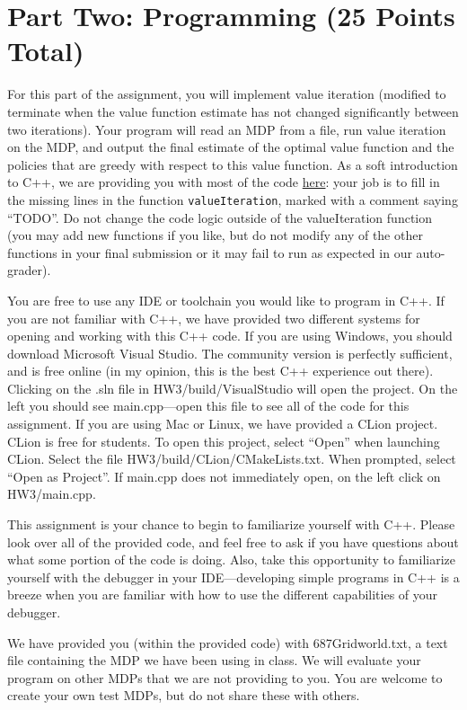 \documentclass[]{article}
\begin{document}
\section*{Part Two: Programming (25 Points Total)}

For this part of the assignment, you will implement value iteration (modified to terminate when the value function estimate has not changed significantly between two iterations). Your program will read an MDP from a file, run value iteration on the MDP, and output the final estimate of the optimal value function and the policies that are greedy with respect to this value function. As a soft introduction to C++, we are providing you with most of the code \href{https://people.cs.umass.edu/~pthomas/courses/CMPSCI_687_Fall2019/HW3Source.zip}{here}: your job is to fill in the missing lines in the function \texttt{valueIteration}, marked with a comment saying ``TODO''. Do not change the code logic outside of the valueIteration function (you may add new functions if you like, but do not modify any of the other functions in your final submission or it may fail to run as expected in our auto-grader).

You are free to use any IDE or toolchain you would like to program in C++. If you are not familiar with C++, we have provided two different systems for opening and working with this C++ code. If you are using Windows, you should download Microsoft Visual Studio. The community version is perfectly sufficient, and is free online (in my opinion, this is the best C++ experience out there). Clicking on the .sln file in HW3/build/VisualStudio will open the project. On the left you should see main.cpp---open this file to see all of the code for this assignment. If you are using Mac or Linux, we have provided a CLion project. CLion is free for students. To open this project, select ``Open'' when launching CLion. Select the file HW3/build/CLion/CMakeLists.txt. When prompted, select ``Open as Project''. If main.cpp does not immediately open, on the left click on HW3/main.cpp.

This assignment is your chance to begin to familiarize yourself with C++. Please look over all of the provided code, and feel free to ask if you have questions about what some portion of the code is doing. Also, take this opportunity to familiarize yourself with the debugger in your IDE---developing simple programs in C++ is a breeze when you are familiar with how to use the different capabilities of your debugger.

We have provided you (within the provided code) with 687Gridworld.txt, a text file containing the MDP we have been using in class. We will evaluate your program on other MDPs that we are not providing to you. You are welcome to create your own test MDPs, but do not share these with others.
\end{document}
